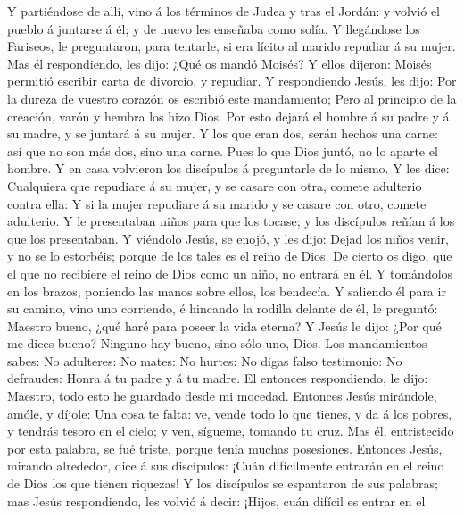  Y partiéndose de allí, vino á los términos de Judea y tras
el Jordán: y volvió el pueblo á juntarse á él; y de nuevo les enseñaba
como solía.  Y llegándose los Fariseos, le preguntaron, para
tentarle, si era lícito al marido repudiar á su mujer.  Mas
él respondiendo, les dijo: ¿Qué os mandó Moisés?  Y ellos
dijeron: Moisés permitió escribir carta de divorcio, y repudiar.
 Y respondiendo Jesús, les dijo: Por la dureza de vuestro
corazón os escribió este mandamiento;  Pero al principio de
la creación, varón y hembra los hizo Dios.  Por esto dejará
el hombre á su padre y á su madre, y se juntará á su mujer. 
Y los que eran dos, serán hechos una carne: así que no son más dos, sino
una carne.  Pues lo que Dios juntó, no lo aparte el hombre.
 Y en casa volvieron los discípulos á preguntarle de lo
mismo.  Y les dice: Cualquiera que repudiare á su mujer, y
se casare con otra, comete adulterio contra ella:  Y si la
mujer repudiare á su marido y se casare con otro, comete adulterio.
 Y le presentaban niños para que los tocase; y los
discípulos reñían á los que los presentaban.  Y viéndolo
Jesús, se enojó, y les dijo: Dejad los niños venir, y no se lo
estorbéis; porque de los tales es el reino de Dios.  De
cierto os digo, que el que no recibiere el reino de Dios como un niño,
no entrará en él.  Y tomándolos en los brazos, poniendo las
manos sobre ellos, los bendecía.  Y saliendo él para ir su
camino, vino uno corriendo, é hincando la rodilla delante de él, le
preguntó: Maestro bueno, ¿qué haré para poseer la vida eterna?
 Y Jesús le dijo: ¿Por qué me dices bueno? Ninguno hay
bueno, sino sólo uno, Dios.  Los mandamientos sabes: No
adulteres: No mates: No hurtes: No digas falso testimonio: No defraudes:
Honra á tu padre y á tu madre.  El entonces respondiendo,
le dijo: Maestro, todo esto he guardado desde mi mocedad. 
Entonces Jesús mirándole, amóle, y díjole: Una cosa te falta: ve, vende
todo lo que tienes, y da á los pobres, y tendrás tesoro en el cielo; y
ven, sígueme, tomando tu cruz.  Mas él, entristecido por
esta palabra, se fué triste, porque tenía muchas posesiones.
 Entonces Jesús, mirando alrededor, dice á sus discípulos:
¡Cuán difícilmente entrarán en el reino de Dios los que tienen riquezas!
 Y los discípulos se espantaron de sus palabras; mas Jesús
respondiendo, les volvió á decir: ¡Hijos, cuán difícil es entrar en el
